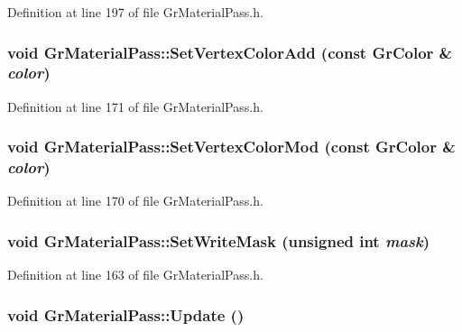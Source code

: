 Definition at line 197 of file GrMaterialPass.h.\hypertarget{class_gr_material_pass_e06601541c21e3d6669d5df0e82c57a1}{
\subsubsection[{SetVertexColorAdd}]{\setlength{\rightskip}{0pt plus 5cm}void GrMaterialPass::SetVertexColorAdd (const {\bf GrColor} \& {\em color})}}
\label{class_gr_material_pass_e06601541c21e3d6669d5df0e82c57a1}




Definition at line 171 of file GrMaterialPass.h.\hypertarget{class_gr_material_pass_3d22971b4cf68d16b982992fcb0a646a}{
\subsubsection[{SetVertexColorMod}]{\setlength{\rightskip}{0pt plus 5cm}void GrMaterialPass::SetVertexColorMod (const {\bf GrColor} \& {\em color})}}
\label{class_gr_material_pass_3d22971b4cf68d16b982992fcb0a646a}




Definition at line 170 of file GrMaterialPass.h.\hypertarget{class_gr_material_pass_d4b4e6721ac85e8e66526390f0c08142}{
\subsubsection[{SetWriteMask}]{\setlength{\rightskip}{0pt plus 5cm}void GrMaterialPass::SetWriteMask (unsigned int {\em mask})}}
\label{class_gr_material_pass_d4b4e6721ac85e8e66526390f0c08142}




Definition at line 163 of file GrMaterialPass.h.\hypertarget{class_gr_material_pass_461a5f3b7e2ffc51491914ed6bd9654c}{
\subsubsection[{Update}]{\setlength{\rightskip}{0pt plus 5cm}void GrMaterialPass::Update ()}}
\label{class_gr_material_pass_461a5f3b7e2ffc51491914ed6bd9654c}




